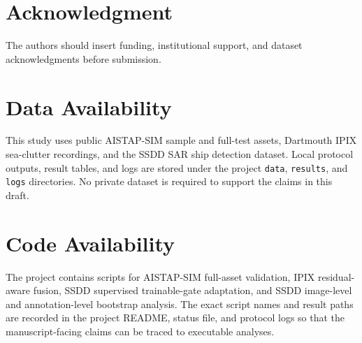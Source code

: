 \documentclass[journal]{IEEEtran}
\begin{document}
\section*{Acknowledgment}

The authors should insert funding, institutional support, and dataset acknowledgments before submission.

\section*{Data Availability}

This study uses public AISTAP-SIM sample and full-test assets, Dartmouth IPIX sea-clutter recordings, and the SSDD SAR ship detection dataset. Local protocol outputs, result tables, and logs are stored under the project \texttt{data}, \texttt{results}, and \texttt{logs} directories. No private dataset is required to support the claims in this draft.

\section*{Code Availability}

The project contains scripts for AISTAP-SIM full-asset validation, IPIX residual-aware fusion, SSDD supervised trainable-gate adaptation, and SSDD image-level and annotation-level bootstrap analysis. The exact script names and result paths are recorded in the project README, status file, and protocol logs so that the manuscript-facing claims can be traced to executable analyses.
\end{document}
